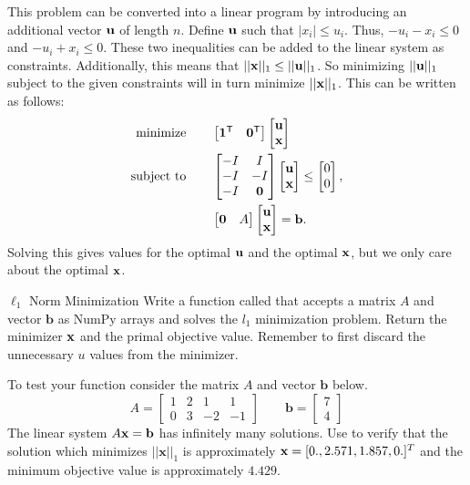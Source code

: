 This problem can be converted into a linear program by introducing an additional vector $\mathbf{u}$ of length $n$.
Define $\mathbf{u}$ such that $|x_i|\leq u_i$. 
Thus, $-u_i-x_i\leq 0$ and $-u_i+x_i\leq 0$.
These two inequalities can be added to the linear system as constraints.
Additionally, this means that $||\mathbf{x}||_1\leq ||\mathbf{u}||_1$.
So minimizing $||\mathbf{u}||_1$ subject to the given constraints will in turn minimize $||\mathbf{x}||_1$.
This can be written as follows:
\begin{align*}
\mbox{minimize}\qquad
&\begin{bmatrix}
\mathbf{1}^{\mathsf T} & \mathbf{0}^{\mathsf T}
\end{bmatrix}
\begin{bmatrix}
\mathbf{u} \\
\mathbf{x}
\end{bmatrix}\\
\mbox{subject to}\qquad
&\begin{bmatrix}
-I & I\\
-I & -I\\
-I & \mathbf{0}
\end{bmatrix}
\begin{bmatrix}
\mathbf{u} \\
\mathbf{x}
\end{bmatrix}
\leq
\begin{bmatrix}
0\\
0
\end{bmatrix},\\
&\begin{bmatrix}
\mathbf{0} & A
\end{bmatrix}
\begin{bmatrix}
\mathbf{u} \\
\mathbf{x}
\end{bmatrix}
=
\mathbf{b}.
\end{align*}
Solving this gives values for the optimal $\mathbf{u}$ and the optimal $\mathbf{x}$, but we only care about the optimal $\mathbf{x}$.

\begin{problem}{$\ell_1$ Norm Minimization}
Write a function called  that accepts a matrix $A$ and vector $\mathbf{b}$ as NumPy arrays and solves the $l_1$ minimization problem.
Return the minimizer $\mathbf{x}$ and the primal objective value.
Remember to first discard the unnecessary $u$ values from the minimizer.

To test your function consider the matrix $A$ and vector $\mathbf{b}$ below.
\[
A = \begin{bmatrix}
1 & 2 & 1 & 1\\
0 & 3 & -2 & -1
\end{bmatrix} \qquad
\mathbf{b} = \begin{bmatrix}
7 \\
4
\end{bmatrix}
\]
The linear system $A\mathbf{x} = \mathbf{b}$ has infinitely many solutions.
Use  to verify that the solution which minimizes $||\mathbf{x}||_1$ is approximately $\mathbf{x} = [0., 2.571, 1.857, 0.]^T$ and the minimum objective value is approximately $4.429$.
\label{prob:l1}
\end{problem}


